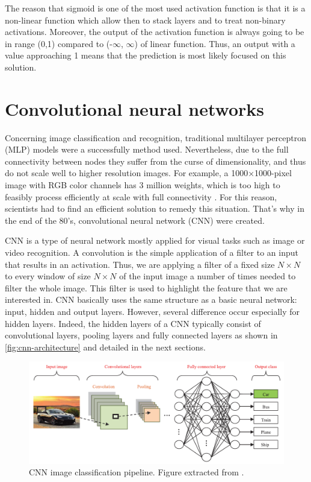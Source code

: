 \documentclass[11pt, openany]{report}
\theoremstyle{plain}
\theoremstyle{definition}
\theoremstyle{remark}
\begin{document}
The reason that sigmoid is one of the most used activation function is that it is a non-linear function which allow then to stack layers and to treat non-binary activations. Moreover, the output of the activation function is always going to be in range (0,1) compared to (-$\infty$, $\infty$) of linear function. Thus, an output with a value approaching 1 means that the prediction is most likely focused on this solution. 

\section{Convolutional neural networks} \label{sec:CNN}
Concerning image classification and recognition, traditional multilayer perceptron (MLP) models were a successfully method used. Nevertheless, due to the full connectivity between nodes they suffer from the curse of dimensionality, and thus do not scale well to higher resolution images. For example, a 1000×1000-pixel image with RGB color channels has 3 million weights, which is too high to feasibly process efficiently at scale with full connectivity \cite{wiki-cnn}. For this reason, scientists had to find an efficient solution to remedy this situation. That's why in the end of the 80's, convolutional neural network (CNN) were created. 

CNN is a type of neural network mostly applied for visual tasks such as image or video recognition.  A convolution is the simple application of a filter to an input that results in an activation. Thus, we are applying a filter of a fixed size $N \times N$ to every window of size $N \times N$ of the input image a number of times needed to filter the whole image. This filter is used to highlight the feature that we are interested in. CNN basically uses the same structure as a basic neural network: input, hidden and output layers. However, several difference occur especially for hidden layers. Indeed, the hidden layers of a CNN typically consist of convolutional layers, pooling layers and fully connected layers as shown in \autoref{fig:cnn-architecture} and detailed in the next sections. 

\begin{figure}[h]
  \centering
  \includegraphics[scale=0.55]{figures/cnn-architecture.png}
  \caption{CNN image classification pipeline. Figure extracted from \cite{CNN-1}.}
  \label{fig:cnn-architecture}
\end{figure}
\end{document}
